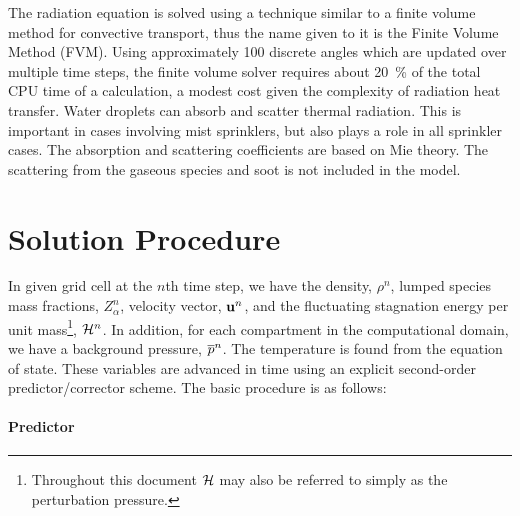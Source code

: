 The radiation equation is solved using a technique similar to a finite
volume method for convective transport, thus the name given to it is
the Finite Volume Method (FVM). Using approximately 100 discrete
angles which are updated over multiple time steps, the finite volume solver requires about 20~\% of the total CPU
time of a calculation, a modest cost given the complexity of radiation
heat transfer.  Water droplets can absorb and scatter thermal
radiation. This is important in cases involving mist sprinklers, but
also plays a role in all sprinkler cases. The absorption and
scattering coefficients are based on Mie theory. The scattering from
the gaseous species and soot is not included in the model.



\section{Solution Procedure}

In given grid cell at the $n$th time step, we have the density, $\rho^n$, lumped species mass fractions, $Z_\alpha^n$, velocity
vector, ${\bf u}^n$, and the fluctuating stagnation energy per unit mass\footnote{Throughout this document ${\cal H}$ may also be referred to simply as the perturbation pressure.}, ${\cal H}^n$.
In addition, for each compartment in the computational domain, we have a background pressure, $\overline{p}^n$. The temperature is
found from the equation of state. These variables are advanced in time using an explicit second-order predictor/corrector scheme.
The basic procedure is as follows:

\paragraph{Predictor}

